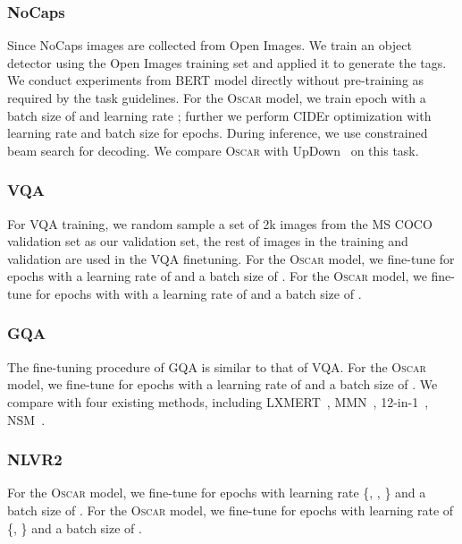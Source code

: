 \documentclass[runningheads]{llncs}
\newcommand{\short}{\textsc{Oscar}}
\newcommand{\shortb}{\textsc{Oscar}}
\newcommand{\shortl}{\textsc{Oscar}}
\def\suppvspace{{\vspace{-3mm}}}
\begin{document}
\suppvspace
\subsubsection{NoCaps}
Since NoCaps images are collected from Open Images. We train an object detector using the Open Images training set and applied it to generate the tags. We conduct experiments from BERT model directly without pre-training as required by the task guidelines. For the \shortb{} model, we train  epoch with a batch size of  and learning rate ; further we perform CIDEr optimization with learning rate  and batch size  for  epochs. During inference, we use constrained beam search for decoding. We compare \short{} with UpDown~\cite{agrawal2019nocaps} on this task.

\suppvspace
\subsubsection{VQA}
For VQA training, we random sample a set of 2k images from the MS COCO validation set as our validation set, the rest of images in the training and validation are used in the VQA finetuning. For the \shortb{} model, we fine-tune for  epochs with a learning rate of  and a batch size of . For the \shortl{} model, we fine-tune for  epochs with with a learning rate of  and a batch size of . 

\suppvspace
\subsubsection{GQA}
The fine-tuning procedure of GQA is similar to that of VQA. For the \shortb{} model, we fine-tune for  epochs with a learning rate of  and a batch size of . We compare with four existing methods, including LXMERT~\cite{tan2019lxmert},
MMN~\cite{chen2019meta},
12-in-1~\cite{lu201912},
NSM~\cite{hudson2019learning}.

\suppvspace
\subsubsection{NLVR2}
For the \shortb{} model, we fine-tune for  epochs with learning rate \{, , \} and a batch size of . For the \shortl{} model, we fine-tune for  epochs with learning rate of \{, \} and a batch size of .
\end{document}
